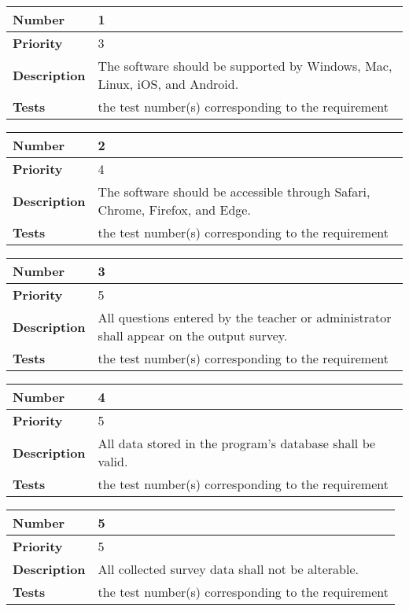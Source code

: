 \documentclass{article}
\begin{document}
\begin{center}
\begin{tabular}{|p{3.5cm}|p{7.5cm}|} 
\hline
\textbf{Number} & 1  \\
\hline
\textbf{Priority} & 3\\ 
\hline
\textbf{Description} & The software should be supported by Windows, Mac, Linux, iOS, and Android. \\ 
\hline
\textbf{Tests }& the test number(s) corresponding to the requirement \\ 
\hline
\end{tabular}

\bigskip
{}
\begin{tabular}{|p{3.5cm}|p{7.5cm}|} 
\hline
\textbf{Number} & 2  \\
\hline
\textbf{Priority} & 4\\ 
\hline
\textbf{Description} & The software should be accessible through Safari, Chrome, Firefox, and Edge. \\ 
\hline
\textbf{Tests }& the test number(s) corresponding to the requirement \\ 
\hline
\end{tabular}


\bigskip
{}
\begin{tabular}{|p{3.5cm}|p{7.5cm}|} 
\hline
\textbf{Number} & 3  \\
\hline
\textbf{Priority} & 5\\ 
\hline
\textbf{Description} & All questions entered by the teacher or administrator shall appear on the output survey. \\ 
\hline
\textbf{Tests }& the test number(s) corresponding to the requirement \\ 
\hline
\end{tabular}


\bigskip
{}
\begin{tabular}{|p{3.5cm}|p{7.5cm}|} 
\hline
\textbf{Number} & 4  \\
\hline
\textbf{Priority} & 5\\ 
\hline
\textbf{Description} & All data stored in the program's database shall be valid. \\ 
\hline
\textbf{Tests }& the test number(s) corresponding to the requirement \\ 
\hline
\end{tabular}


\bigskip
{}
\begin{tabular}{|p{3.5cm}|p{7.5cm}|} 
\hline
\textbf{Number} & 5  \\
\hline
\textbf{Priority} & 5\\ 
\hline
\textbf{Description} & All collected survey data shall not be alterable.\\ 
\hline
\textbf{Tests }& the test number(s) corresponding to the requirement \\ 
\hline
\end{tabular}



\end{center}
\end{document}
